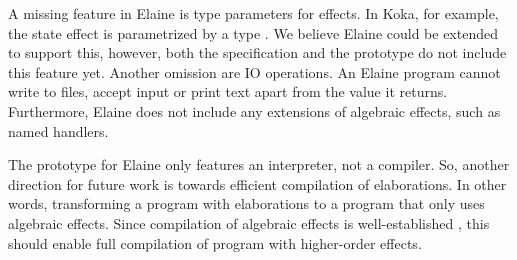 A missing feature in Elaine is type parameters for effects. In Koka, for example, the state effect  is parametrized by a type . We believe Elaine could be extended to support this, however, both the specification and the prototype do not include this feature yet. Another omission are IO operations. An Elaine program cannot write to files, accept input or print text apart from the value it returns. Furthermore, Elaine does not include any extensions of algebraic effects, such as named handlers.

The prototype for Elaine only features an interpreter, not a compiler. So, another direction for future work is towards efficient compilation of elaborations. In other words, transforming a program with elaborations to a program that only uses algebraic effects. Since compilation of algebraic effects is well-established \autocite{leijen_type_2017}, this should enable full compilation of program with higher-order effects.
